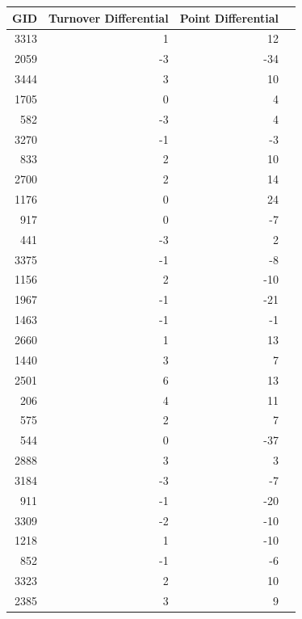 \documentclass{exam}
\begin{document}
  \begin{table}[H]
    \centering
    \begin{tabular}{rrrr}
      \toprule
      GID  & Turnover Differential & Point Differential \\
      \midrule
      3313 & 1                     & 12 \\
      2059 & -3                    & -34 \\
      3444 & 3                     & 10 \\
      1705 & 0                     & 4 \\
      582  & -3                    & 4 \\
      3270 & -1                    & -3 \\
      833  & 2                     & 10 \\
      2700 & 2                     & 14 \\
      1176 & 0                     & 24 \\
      917  & 0                     & -7 \\
      441  & -3                    & 2 \\
      3375 & -1                    & -8 \\
      1156 & 2                     & -10 \\
      1967 & -1                    & -21 \\
      1463 & -1                    & -1 \\
      2660 & 1                     & 13 \\
      1440 & 3                     & 7 \\
      2501 & 6                     & 13 \\
      206  & 4                     & 11 \\
      575  & 2                     & 7 \\
      544  & 0                     & -37 \\
      2888 & 3                     & 3 \\
      3184 & -3                    & -7 \\
      911  & -1                    & -20 \\
      3309 & -2                    & -10 \\
      1218 & 1                     & -10 \\
      852  & -1                    & -6 \\
      3323 & 2                     & 10 \\
      2385 & 3                     & 9 \\

\end{tabular}
\end{table}
\end{document}
